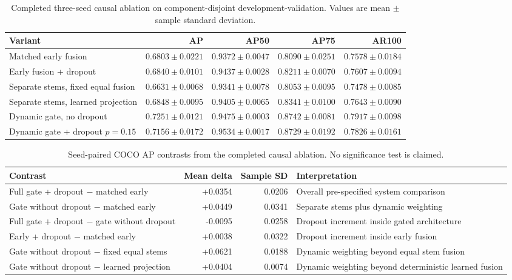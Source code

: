 \begin{table}[t]
\centering
\caption{Completed three-seed causal ablation on component-disjoint development-validation. Values are mean $\pm$ sample standard deviation.}
\label{tab:causal-groups}
\scriptsize
\setlength{\tabcolsep}{3.0pt}
\begin{tabular}{@{}lrrrr@{}}
\toprule
Variant & AP & AP50 & AP75 & AR100\\
\midrule
Matched early fusion & $0.6803\pm0.0221$ & $0.9372\pm0.0047$ & $0.8090\pm0.0251$ & $0.7578\pm0.0184$\\
Early fusion + dropout & $0.6840\pm0.0101$ & $0.9437\pm0.0028$ & $0.8211\pm0.0070$ & $0.7607\pm0.0094$\\
Separate stems, fixed equal fusion & $0.6631\pm0.0068$ & $0.9341\pm0.0078$ & $0.8053\pm0.0095$ & $0.7478\pm0.0085$\\
Separate stems, learned projection & $0.6848\pm0.0095$ & $0.9405\pm0.0065$ & $0.8341\pm0.0100$ & $0.7643\pm0.0090$\\
Dynamic gate, no dropout & $\mathbf{0.7251\pm0.0121}$ & $0.9475\pm0.0003$ & $\mathbf{0.8742\pm0.0081}$ & $\mathbf{0.7917\pm0.0098}$\\
Dynamic gate + dropout $p=0.15$ & $0.7156\pm0.0172$ & $\mathbf{0.9534\pm0.0017}$ & $0.8729\pm0.0192$ & $0.7826\pm0.0161$\\
\bottomrule
\end{tabular}
\end{table}

\begin{table}[t]
\centering
\caption{Seed-paired COCO AP contrasts from the completed causal ablation. No significance test is claimed.}
\label{tab:causal-contrasts}
\scriptsize
\begin{tabularx}{\textwidth}{@{}YrrY@{}}
\toprule
Contrast & Mean delta & Sample SD & Interpretation\\
\midrule
Full gate + dropout $-$ matched early & +0.0354 & 0.0206 & Overall pre-specified system comparison\\
Gate without dropout $-$ matched early & +0.0449 & 0.0341 & Separate stems plus dynamic weighting\\
Full gate + dropout $-$ gate without dropout & -0.0095 & 0.0258 & Dropout increment inside gated architecture\\
Early + dropout $-$ matched early & +0.0038 & 0.0322 & Dropout increment inside early fusion\\
Gate without dropout $-$ fixed equal stems & +0.0621 & 0.0188 & Dynamic weighting beyond equal stem fusion\\
Gate without dropout $-$ learned projection & +0.0404 & 0.0074 & Dynamic weighting beyond deterministic learned fusion\\
\bottomrule
\end{tabularx}
\end{table}

